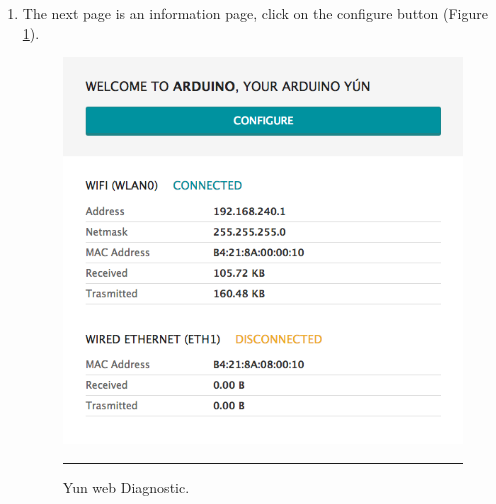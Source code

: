 \documentclass[12pt, a4paper,twoside]{tesi_upf}
\begin{document}
\begin{enumerate}
        \item The next page is an information page, click on the configure button (Figure \ref{fig:YunWebDiagnostic}).
          \begin{figure}[htbp]
            \centering
                \includegraphics[scale=0.3]{./Figures/YunWebDiagnostic.png}
                \\
                \rule{15em}{0.5pt}
            \caption[Yun web Diagnostic]{Yun web Diagnostic.}
            \label{fig:YunWebDiagnostic}
          \end{figure}
        

\end{enumerate}
\end{document}

